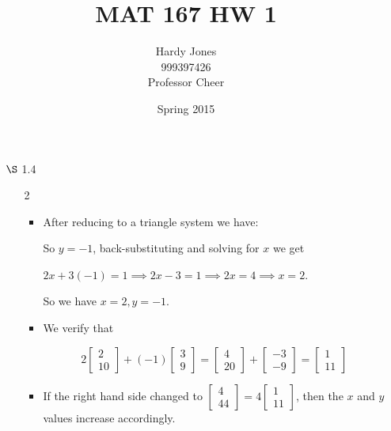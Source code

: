 \documentclass[12pt,letterpaper]{article}
\title{MAT 167 HW 1\vspace{-2ex}}
\author{Hardy Jones\\
        999397426\\
        Professor Cheer\vspace{-2ex}}
\date{Spring 2015}
\begin{document}
  \maketitle

  \begin{enumerate}
    \item [$\S$ 1.4]
      \begin{enumerate}
        \item [2]

          \begin{itemize}
            \item
              After reducing to a triangle system we have:


              So $y = -1$, back-substituting and solving for $x$ we get

              $2x + 3(-1) = 1 \implies 2x - 3 = 1 \implies 2x = 4 \implies x = 2$.

              So we have $x = 2, y = -1$.
            \item
              We verify that

              \[
                2 \begin{bmatrix}2 \\ 10\end{bmatrix} + (-1) \begin{bmatrix}3 \\ 9\end{bmatrix}
                = \begin{bmatrix}4 \\ 20\end{bmatrix} + \begin{bmatrix}-3 \\ -9\end{bmatrix}
                = \begin{bmatrix}1 \\ 11\end{bmatrix}
              \]
            \item
              If the right hand side changed to $\begin{bmatrix}4 \\ 44\end{bmatrix} = 4\begin{bmatrix}1 \\ 11\end{bmatrix}$,
              then the $x$ and $y$ values increase accordingly.


\end{itemize}
\end{enumerate}
\end{enumerate}
\end{document}
